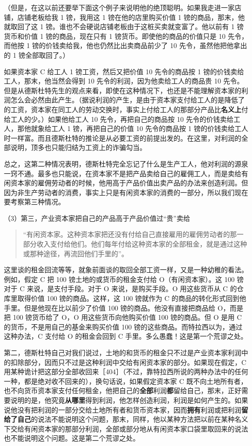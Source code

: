 （但是，在这以前还要举下面这个例子来说明他的绝顶聪明。如果我走进一家店铺，店铺老板给我 1 镑，我用这 1 镑在他的店里购买价值 1 镑的商品，那末，他就取回了这 1 镑。谁也不会硬说店铺老板由于这桩买卖就变富了。他以前有 1 镑货币和价值 1 镑的商品，现在只有 1 镑货币。即使他的商品的价值只是 10 先令，而他按 1 镑的价钱卖给我，他也仍然比出卖商品前少了 10 先令，虽然他把他拿出的 1 镑全部取回了。）

如果资本家 C 给工人 1 镑工资，然后又把价值 10 先令的商品按 1 镑的价钱卖给工人，那末，他当然会得到 10 先令的利润，因为他卖给工人的商品贵 10 先令。但是从德斯杜特先生的观点来看，即使在这种情况下，也还是不能理解资本家的利润怎么会必然由此产生。（据说利润的产生，是由于资本家支付给工人的是降低了的工资，资本家在同工人的劳动交换时，事实上付给工人的那部分产品比\textbf{名义上}付给工人的少。）如果他给工人 10 先令，再把自己的商品按 10 先令的价钱卖给工人，那他就象给工人 1 镑，再把自己的价值 10 先令的商品按 1 镑的价钱卖给工人时一样富。而且德斯杜特的推论是从必要工资的前提出发的。在这里，对利润的全部说明，顶多也只能归结为工资上的诈骗勾当。

总之，这第二种情况表明，德斯杜特完全忘记了什么是生产工人，他对利润的源泉一窍不通。最多也只能说，在资本家不是把产品卖给自己的雇佣工人，而是卖给有闲资本家的雇佣劳动者的时候，他用高于产品价值出卖产品的办法来创造利润。但因为非生产劳动者的消费，事实上只是有闲资本家的消费的一部分，所以我们现在要考察第三种情况。

（3）第三，产业资本家把自己的产品高于产品价值过“贵”卖给

\begin{quote}“有闲资本家。这种资本家把还没有付给自己直接雇用的雇佣劳动者的那一部分收入支付给他们。他们每年付给这种资本家的全部租金，就是通过这种或那种途径，再流回他们手里的”。\end{quote}

这里谈的租金回流等等，就象前面谈的取回全部工资一样，又是一种幼稚的看法。例如，假定 C 把 100 镑土地的或货币的租金支付给 O（有闲资本家）。这 100 镑对于 C 来说，是支付手段。对于 O 来说，是购买手段。O 用这些货币从 C 的仓库里取得价值 100 镑的商品。这样，这 100 镑就作为 C 的商品的转化形式回到他手里。但是他现在比以前少了价值 100 镑的商品。他没有直接把商品给 O，而是把 100 镑货币给了 O，O 用这些货币向他购买价值 100 镑的商品。但 O 是用 C 的货币，不是用自己的基金来购买价值 100 镑的这些商品。而特拉西以为，通过这种办法，C 支付给 O 的租金会回到 C 手里。多么愚蠢！这是第一个荒谬之处。

第二，德斯杜特自己对我们说过，土地的和货币的租金只不过是产业资本家利润中的扣除部分，因而只不过是这种利润中交给有闲资本家的部分。如果现在假定，C 用某种诡计把这部分全部收回来［404］（不过，靠特拉西所说的两种办法中的任何一种，都是绝对收不回来的），换句话说，如果假定资本家 C 既不向土地所有者，也不向货币资本家支付任何租金，他把自己的\textbf{全部}利润\textbf{都}留给自己，那末，正好需要说明的是，他究竟\textbf{从哪里}得到利润，他怎样创造利润，利润是如何产生的。如果说他没有把利润的一部分交给土地所有者和货币资本家，因而\textbf{拥有}利润或把利润\textbf{留给了自己}的说法不能说明这个问题，那末，同样，他以某种方法把以前在某种名义下交给有闲资本家的那部分利润，全部或部分地从有闲资本家口袋里取回来的说法也不能说明这个问题。这是第二个荒谬之处。

